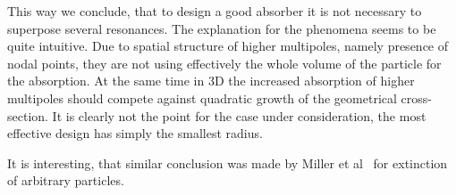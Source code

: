 \documentclass[aps,prl,twocolumn,showpacs,superscriptaddress,groupedaddress]{revtex4-1}
\begin{document}

This way we conclude, that to design a good absorber it is not
necessary to superpose several resonances.  The explanation for the
phenomena seems to be quite intuitive.  Due to spatial structure of
higher multipoles, namely presence of nodal points, they are not using
effectively the whole volume of the particle for the absorption. At
the same time in 3D the increased absorption of higher multipoles should
compete against quadratic growth of the geometrical cross-section.  It
is clearly not the point for the case under consideration, the most
effective design has simply the smallest radius.


It is interesting, that similar conclusion was made by Miller et
al~\cite{Miller-2014} for extinction of arbitrary particles.



\end{document}
